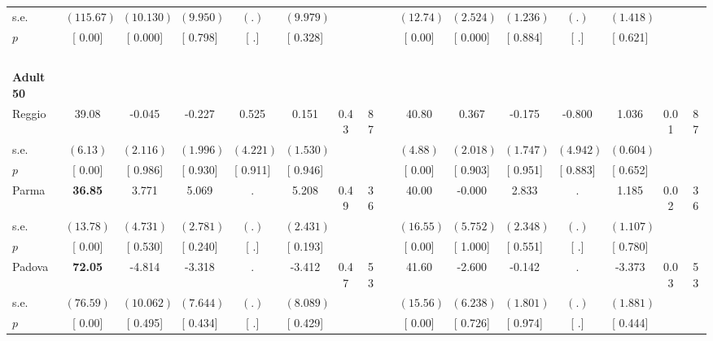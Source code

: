 \begin{longtable}{L{8em} c c c c c c c p{1em} c c c c c c c}
\quad \quad \quad \quad s.e.& $ (   115.67)$ & $ (   10.130)$ & $ (    9.950)$ & $ (        .)$ & $ (    9.979)$ & & & & $ (    12.74)$ & $ (    2.524)$ & $ (    1.236)$ & $ (        .)$ & $ (    1.418)$ & &  \\*
\quad \quad \quad \quad $ p$ & [     0.00] & [    0.000] & [    0.798] & [        .] & [    0.328] & & & & [     0.00] & [    0.000] & [    0.884] & [        .] & [    0.621] & &  \\[1em]
~\\[1em]
\quad \quad \textbf{Adult 50} & & & & & & & & & & & & & & & \\* 
\quad \quad \quad Reggio& 39.08 &    -0.045 &    -0.227 &     0.525 &     0.151 &      0.43 &        87 & & 40.80 &     0.367 &    -0.175 &    -0.800 &     1.036 &      0.01 &        87  \\*
\quad \quad \quad \quad s.e.& $ (     6.13)$ & $ (    2.116)$ & $ (    1.996)$ & $ (    4.221)$ & $ (    1.530)$ & & & & $ (     4.88)$ & $ (    2.018)$ & $ (    1.747)$ & $ (    4.942)$ & $ (    0.604)$ & &  \\*
\quad \quad \quad \quad $ p$ & [     0.00] & [    0.986] & [    0.930] & [    0.911] & [    0.946] & & & & [     0.00] & [    0.903] & [    0.951] & [    0.883] & [    0.652] & &  \\[1em]
\quad \quad \quad Parma& \textbf{    36.85} &     3.771 &     5.069 &         . &     5.208 &      0.49 &        36 & & 40.00 &    -0.000 &     2.833 &         . &     1.185 &      0.02 &        36  \\*
\quad \quad \quad \quad s.e.& $ (    13.78)$ & $ (    4.731)$ & $ (    2.781)$ & $ (        .)$ & $ (    2.431)$ & & & & $ (    16.55)$ & $ (    5.752)$ & $ (    2.348)$ & $ (        .)$ & $ (    1.107)$ & &  \\*
\quad \quad \quad \quad $ p$ & [     0.00] & [    0.530] & [    0.240] & [        .] & [    0.193] & & & & [     0.00] & [    1.000] & [    0.551] & [        .] & [    0.780] & &  \\[1em]
\quad \quad \quad Padova& \textbf{    72.05} &    -4.814 &    -3.318 &         . &    -3.412 &      0.47 &        53 & & 41.60 &    -2.600 &    -0.142 &         . &    -3.373 &      0.03 &        53  \\*
\quad \quad \quad \quad s.e.& $ (    76.59)$ & $ (   10.062)$ & $ (    7.644)$ & $ (        .)$ & $ (    8.089)$ & & & & $ (    15.56)$ & $ (    6.238)$ & $ (    1.801)$ & $ (        .)$ & $ (    1.881)$ & &  \\*
\quad \quad \quad \quad $ p$ & [     0.00] & [    0.495] & [    0.434] & [        .] & [    0.429] & & & & [     0.00] & [    0.726] & [    0.974] & [        .] & [    0.444] & &  \\[1em]

\end{longtable}

